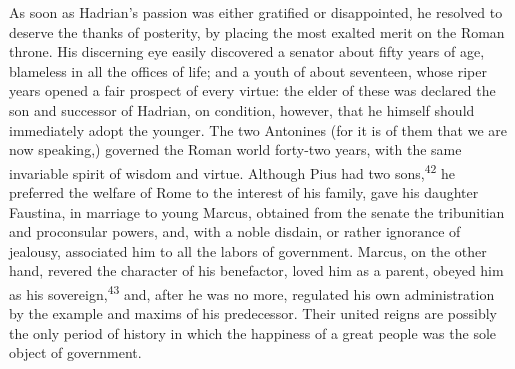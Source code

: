 

As soon as Hadrian’s passion was either gratified or
disappointed, he resolved to deserve the thanks of posterity, by
placing the most exalted merit on the Roman throne. His
discerning eye easily discovered a senator about fifty years of
age, blameless in all the offices of life; and a youth of about
seventeen, whose riper years opened a fair prospect of every
virtue: the elder of these was declared the son and successor of
Hadrian, on condition, however, that he himself should
immediately adopt the younger. The two Antonines (for it is of
them that we are now speaking,) governed the Roman world
forty-two years, with the same invariable spirit of wisdom and
virtue. Although Pius had two sons,\textsuperscript{42} he preferred the welfare
of Rome to the interest of his family, gave his daughter
Faustina, in marriage to young Marcus, obtained from the senate
the tribunitian and proconsular powers, and, with a noble
disdain, or rather ignorance of jealousy, associated him to all
the labors of government. Marcus, on the other hand, revered the
character of his benefactor, loved him as a parent, obeyed him as
his sovereign,\textsuperscript{43} and, after he was no more, regulated his own
administration by the example and maxims of his predecessor.
Their united reigns are possibly the only period of history in
which the happiness of a great people was the sole object of
government.


